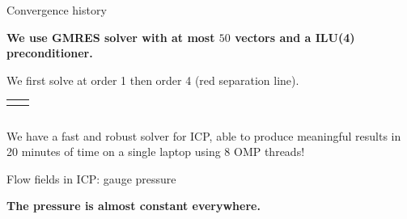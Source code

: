 \documentclass[24pt,t,table, aspectratio=169]{beamer}
\begin{document}
\begin{frame}{Convergence history}

\textbf{We use GMRES solver with at most $50$ vectors and a ILU(4) preconditioner.}

We first solve at order 1 then order 4 (red separation line).

\begin{center}
{
\begin{tabular}{cc}
 & 
\end{tabular}
}
{
\begin{tabular}{c}

\end{tabular}
}
\end{center}

{
We have a fast and robust solver for ICP, able to produce meaningful results in 20 minutes of time on a single laptop using 8 OMP threads!
}

\end{frame}

\begin{frame}{Flow fields in ICP: gauge pressure}

\begin{center}
\end{center}

\begin{framed}
\centering
\textbf{The pressure is almost constant everywhere.}
\end{framed}

\end{frame}
\end{document}
